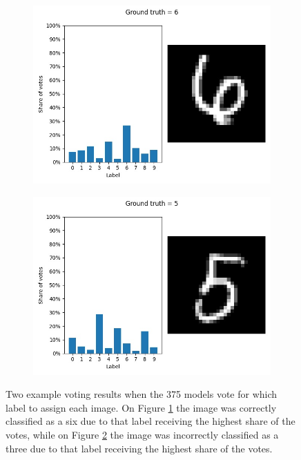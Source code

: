 \begin{figure}
    \begin{subfigure}{.5\textwidth}
        \centering
        \includegraphics[width=\linewidth]{figures/example-vote-1.jpg}
        \caption{}
        \label{fig:example-votes-a}
    \end{subfigure}
    \begin{subfigure}{.5\textwidth}
        \centering
        \includegraphics[width=\linewidth]{figures/example-vote-2.jpg}
        \caption{}
        \label{fig:example-votes-b}
    \end{subfigure}
    \caption{Two example voting results when the 375 models vote for which label to assign each image. On Figure \ref{fig:example-votes-a} the image was correctly classified as a six due to that label receiving the highest share of the votes, while on Figure \ref{fig:example-votes-b} the image was incorrectly classified as a three due to that label receiving the highest share of the votes.}
    \label{fig:example-votes}
\end{figure}

